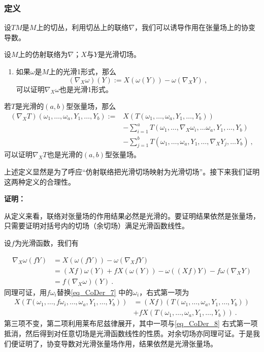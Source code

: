\subsubsection{定义}
设$TM$是$M$上的切丛，利用切丛上的联络$\nabla$，我们可以诱导作用在张量场上的协变导数。
\begin{theorem}{}
设$M$上的仿射联络为$\nabla$；$X$与$Y$是光滑切场。
\begin{enumerate}
\item 如果$\omega$是$M$上的光滑1形式，那么
\begin{equation}
\left(\nabla_X \omega\right)(Y):=X(\omega(Y))-\omega\left(\nabla_X Y\right)~,
\end{equation}
可以证明$\nabla_X \omega$也是光滑1形式。
\end{enumerate}
\end{theorem}
若$T$是光滑的$(a,b)$型张量场，那么
\begin{equation}\label{eq_CoDer_7}
\begin{aligned}
\left(\nabla_X T\right)\left(\omega_1, \ldots, \omega_a, Y_1, \ldots, Y_b\right):= & X\left(T\left(\omega_1, \ldots, \omega_a, Y_1, \ldots, Y_b\right)\right) \\
& -\sum_{i=1}^a T\left(\omega_1, \ldots, \nabla_X \omega_i, \ldots \omega_a, Y_1, \ldots, Y_b\right) \\
& -\sum_{j=1}^b T\left(\omega_1, \ldots, \omega_a, Y_1, \ldots, \nabla_X Y_j, \ldots Y_b\right)~,
\end{aligned}
\end{equation}
可以证明$\nabla_X T$也是光滑的$(a,b)$型张量场。

上述定义显然是为了呼应“仿射联络把光滑切场映射为光滑切场”。接下来我们证明这两种定义的合理性。

\textbf{证明：}

从定义来看，联络对张量场的作用结果必然是光滑的。要证明结果依然是张量场，只需要证明对括号内的切场（余切场）满足光滑函数线性。

设$f$为光滑函数，我们有

\begin{equation}
\begin{aligned}
\nabla_X\omega(fY)&=X(\omega(fY))-\omega(\nabla_XfY)\\
& =(X f) \omega(Y)+f X(\omega(Y))-\omega((X f) Y)-f \omega\left(\nabla_X Y\right) \\
& =f\left(\nabla_X \omega\right)(Y)~.
\end{aligned}
\end{equation}
同理可证，用$f\omega_i$替换\autoref{eq_CoDer_7} 中的$\omega_i$，右式第一项为
\begin{equation}\label{eq_CoDer_8}
\begin{aligned}
X\left(T\left(\omega_1, \ldots, f\omega_i,\ldots,\omega_a, Y_1, \ldots, Y_b\right)\right)&=(Xf)\left(T\left(\omega_1, \ldots,\omega_a, Y_1, \ldots, Y_b\right)\right)\\&+fX\left(T\left(\omega_1, \ldots,\omega_a, Y_1, \ldots, Y_b\right)\right)~.
\end{aligned}
\end{equation}
第三项不变，第二项利用莱布尼兹律展开，其中一项与\autoref{eq_CoDer_8} 右式第一项抵消，然后得到对任意切场是光滑函数线性的性质。对余切场亦同理可证。于是我们便证明了，协变导数对光滑张量场作用，结果依然是光滑张量场。
